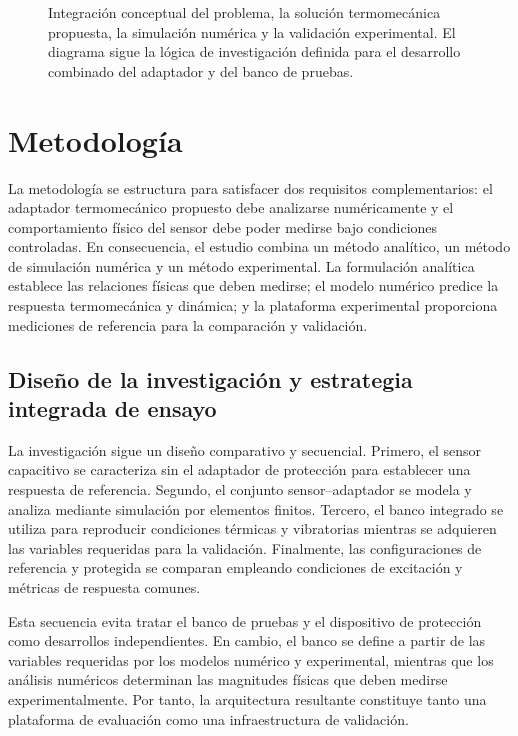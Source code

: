 \documentclass[conference]{IEEEtran}
\begin{document}
\begin{figure}[t]
\centering
{}
\caption{Integración conceptual del problema, la solución termomecánica propuesta, la simulación numérica y la validación experimental. El diagrama sigue la lógica de investigación definida para el desarrollo combinado del adaptador y del banco de pruebas.}
\label{fig:conceptual}
\end{figure}


\section{Metodología}

La metodología se estructura para satisfacer dos requisitos complementarios: el adaptador termomecánico propuesto debe analizarse numéricamente y el comportamiento físico del sensor debe poder medirse bajo condiciones controladas. En consecuencia, el estudio combina un método analítico, un método de simulación numérica y un método experimental. La formulación analítica establece las relaciones físicas que deben medirse; el modelo numérico predice la respuesta termomecánica y dinámica; y la plataforma experimental proporciona mediciones de referencia para la comparación y validación.

\subsection{Diseño de la investigación y estrategia integrada de ensayo}

La investigación sigue un diseño comparativo y secuencial. Primero, el sensor capacitivo se caracteriza sin el adaptador de protección para establecer una respuesta de referencia. Segundo, el conjunto sensor--adaptador se modela y analiza mediante simulación por elementos finitos. Tercero, el banco integrado se utiliza para reproducir condiciones térmicas y vibratorias mientras se adquieren las variables requeridas para la validación. Finalmente, las configuraciones de referencia y protegida se comparan empleando condiciones de excitación y métricas de respuesta comunes.

Esta secuencia evita tratar el banco de pruebas y el dispositivo de protección como desarrollos independientes. En cambio, el banco se define a partir de las variables requeridas por los modelos numérico y experimental, mientras que los análisis numéricos determinan las magnitudes físicas que deben medirse experimentalmente. Por tanto, la arquitectura resultante constituye tanto una plataforma de evaluación como una infraestructura de validación.
\end{document}
